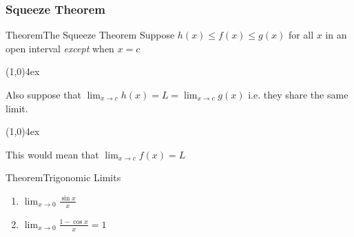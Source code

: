 \documentclass{MathNotes}
\newenvironment{theorem}[1]{\begin{GrayBox}{Theorem}{#1}}{\end{GrayBox}}
\newcommand{\br}{
\begin{center}
\line(1,0){4ex}
\end{center}}
\begin{document}
\newpage
\subsubsection{Squeeze Theorem}\label{sec:1.2.2}

\begin{multicols}{2}[]
    \begin{theorem}{The Squeeze Theorem}
        Suppose $h(x)\leq f(x) \leq g(x)$ for all $x$ in an open interval
        \textit{except} when $x=c$
        \br

        Also suppose that $\displaystyle\lim_{x\to c}h(x)=L=\lim_{x\to c}g(x)$ i.e. they share
        the same limit.
        \br

        This would mean that $\lim_{x\to c}f(x)=L$
    \end{theorem}

    \begin{theorem}{Trigonomic Limits}
        \begin{enumerate}
            \item $\displaystyle\lim_{x\to 0}\frac{\sin x}{x}$
            \item $\displaystyle\lim_{x\to 0}\frac{1 - \cos x}{x} = 1$
        \end{enumerate}
    \end{theorem}

    \begin{center}
\end{center}
\end{multicols}
\end{document}
